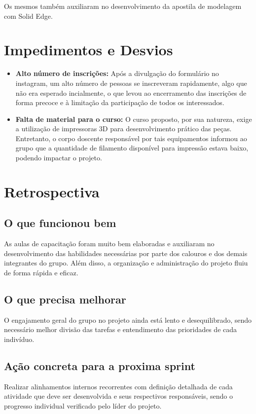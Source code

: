 \documentclass [12 pt ,a4 paper]{article}
\begin{document}
Os mesmos também auxiliaram no desenvolvimento da apostila de modelagem com Solid Edge.


\section {Impedimentos e Desvios}

\begin{itemize}
    \item \textbf{Alto número de inscrições:} Após a divulgação do formulário no instagram, um alto número de pessoas se inscreveram rapidamente, algo que não era esperado incialmente, o que levou ao encerramento das inscrições de forma precoce e à limitação da participação de todos os interessados.
    \item \textbf{Falta de material para o curso:} O curso proposto, por sua natureza, exige a utilização de impressoras 3D para desenvolvimento prático das peças. Entretanto, o corpo doscente responsável por tais equipamentos informou ao grupo que a quantidade de filamento disponível para impressão estava baixo, podendo impactar o projeto.
\end{itemize}


\section {Retrospectiva}
\subsection {O que funcionou bem}
As aulas de capacitação foram muito bem elaboradas e auxiliaram no desenvolvimento das habilidades necessárias por parte dos calouros e dos demais integrantes do grupo.
Além disso, a organização e administração do projeto fluiu de forma rápida e eficaz.
\subsection {O que precisa melhorar}
O engajamento geral do grupo no projeto ainda está lento e desequilibrado, sendo necessário melhor divisão das tarefas e entendimento das prioridades de cada indivíduo.
\subsection {Ação concreta para a proxima sprint}
Realizar alinhamentos internos recorrentes com definição detalhada de cada atividade que deve ser desenvolvida e seus respectivos responsáveis, sendo o progresso individual verificado pelo líder do projeto.
\end{document}
